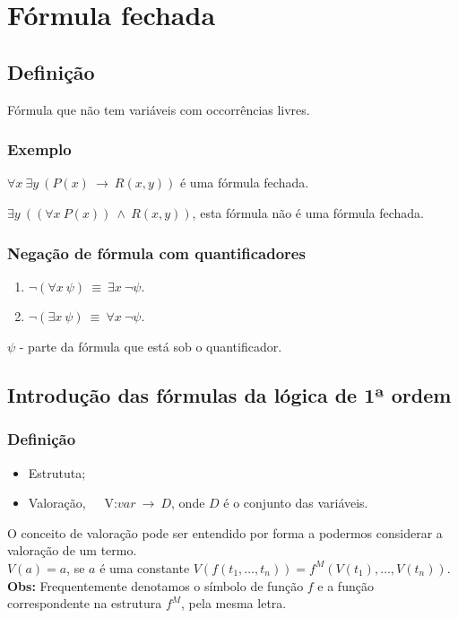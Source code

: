 \documentclass[11pt]{report}
\begin{document}
    \chapter*{Fórmula fechada} {
    \section*{Definição} {
        Fórmula que não tem variáveis com occorrências livres.
        \subsection*{Exemplo} {
            $\forall x~\exists y~(P(x)~\rightarrow~R(x,y))$ é uma fórmula fechada.
            \par $\exists y~((\forall x~P(x))~\wedge~R(x,y))$, esta fórmula não é uma fórmula fechada.
        }
        \subsection*{Negação de fórmula com quantificadores} {
            \begin{enumerate}
                \item $\neg (\forall x~\psi)~\equiv~\exists x~\neg \psi$.
                \item $\neg (\exists x~\psi)~\equiv~\forall x~\neg \psi$.
            \end{enumerate}
            $\psi$ - parte da fórmula que está sob o quantificador.
        }
    }
    \section*{Introdução das fórmulas da lógica de 1ª ordem} {
        \subsection*{Definição} {
            \begin{itemize}
                \item Estrututa;
                \item Valoração,~~~V:$var~\rightarrow~D$, onde $D$ é o conjunto das variáveis.
            \end{itemize}
            O conceito de valoração pode ser entendido por forma a podermos considerar a valoração de um termo.\\
            $V(a) = a$, se $a$ é uma constante $V(f(t_1,\ldots,t_n)) = f^M(V(t_1),\ldots,V(t_n))$.
            \textbf{Obs:} Frequentemente denotamos o símbolo de função $f$ e a função correspondente na estrutura $f^M$, pela mesma letra.
        }
}}
\end{document}
